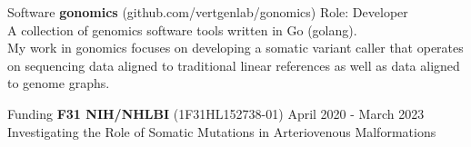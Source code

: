 \documentclass{resume} %
\begin{document}
\begin{rSection}{Software}
{\bf gonomics} {(github.com/vertgenlab/gonomics)} \hfill{Role: Developer}
\\ {A collection of genomics software tools written in Go (golang).}
\\ {My work in gonomics focuses on developing a somatic variant caller that operates on sequencing data 
aligned to traditional linear references as well as data aligned to genome graphs.}


\end{rSection}

\begin{rSection}{Funding}
{\bf F31 NIH/NHLBI  }{(1F31HL152738-01)}  \hfill {April 2020 - March 2023}\\
Investigating the Role of Somatic Mutations in Arteriovenous Malformations\\
\end{rSection}
\end{document}
